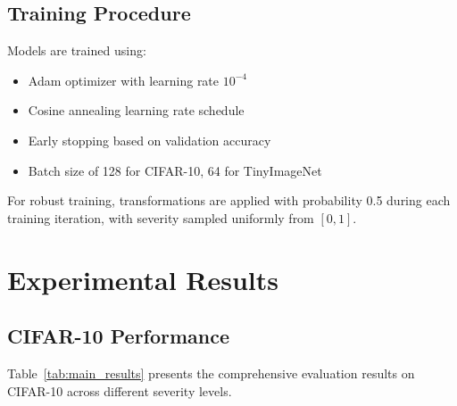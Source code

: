 \documentclass[11pt,a4paper]{article}
\begin{document}
\subsection{Training Procedure}

Models are trained using:
\begin{itemize}
    \item Adam optimizer with learning rate $10^{-4}$
    \item Cosine annealing learning rate schedule
    \item Early stopping based on validation accuracy
    \item Batch size of 128 for CIFAR-10, 64 for TinyImageNet
\end{itemize}

For robust training, transformations are applied with probability 0.5 during each training iteration, with severity sampled uniformly from $[0, 1]$.

\section{Experimental Results}

\subsection{CIFAR-10 Performance}

Table~\ref{tab:main_results} presents the comprehensive evaluation results on CIFAR-10 across different severity levels.
\end{document}
